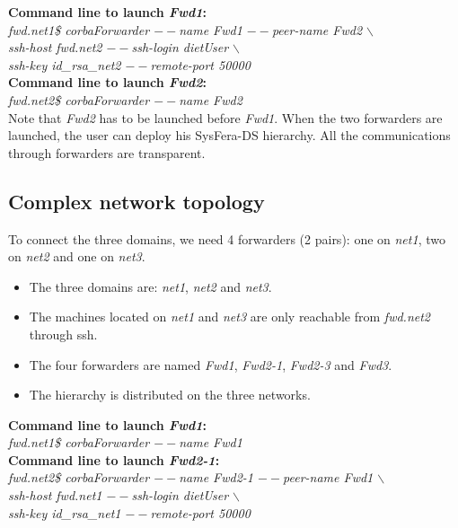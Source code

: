 \documentclass{report}
\begin{document}
\noindent\textbf{Command line to launch \textit{Fwd1}: }\\
{\small \it fwd.net1\$ corbaForwarder {\tiny$--$}name Fwd1
  {\tiny$--$}peer-name Fwd2 $\backslash$\\
  \hspace*{4.2cm}{\tiny$--$}ssh-host fwd.net2 {\tiny$--$}ssh-login
  dietUser $\backslash$\\
  \hspace*{4.2cm}{\tiny$--$}ssh-key id\_rsa\_net2
  {\tiny$--$}remote-port 50000}\\[2mm]
\noindent\textbf{Command line to launch \textit{Fwd2}: }\\
{\small \it fwd.net2\$ corbaForwarder {\tiny$--$}name Fwd2}\\[3mm]

Note that \textit{Fwd2} has to be launched before \textit{Fwd1}.
When the two forwarders are launched, the user can deploy his SysFera-DS
hierarchy. All the communications through  forwarders are
transparent.

\subsection*{Complex network topology}
To connect the three domains, we need 4 forwarders (2 pairs): one on
\textit{net1}, two on \textit{net2} and one on \textit{net3}.
\begin{itemize}
\item The three domains are: \textit{net1}, \textit{net2} and
  \textit{net3}.
\item The machines located on \textit{net1} and \textit{net3} are only
  reachable from \textit{fwd.net2} through ssh.
\item The four forwarders are named \textit{Fwd1}, \textit{Fwd2-1},
  \textit{Fwd2-3} and \textit{Fwd3}.
\item The hierarchy is distributed on the three networks.\\
\end{itemize}

\noindent\textbf{Command line to launch \textit{Fwd1}: }\\
{\small \it fwd.net1\$ corbaForwarder {\tiny$--$}name Fwd1}\\[2mm]

\noindent\textbf{Command line to launch \textit{Fwd2-1}: }\\
{\small \it fwd.net2\$ corbaForwarder {\tiny$--$}name Fwd2-1
  {\tiny$--$}peer-name Fwd1 $\backslash$\\
  \hspace*{4.2cm}{\tiny$--$}ssh-host fwd.net1 {\tiny$--$}ssh-login
  dietUser $\backslash$\\
  \hspace*{4.2cm}{\tiny$--$}ssh-key id\_rsa\_net1
  {\tiny$--$}remote-port 50000}\\[2mm]
\end{document}

